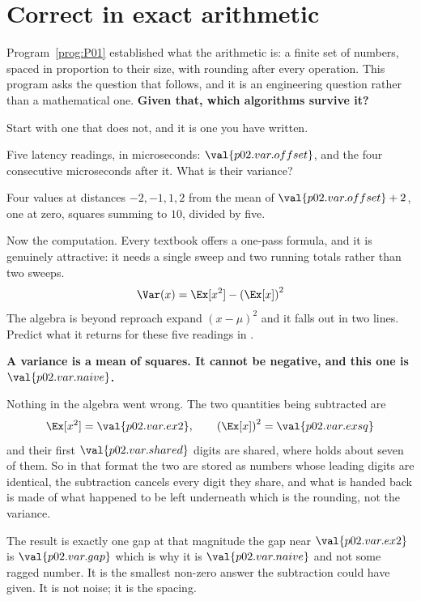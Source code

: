 \section{Correct in exact arithmetic}
\label{sec:P02-correct}

\begin{fr}
Program~\ref{prog:P01} established what the arithmetic is: a finite set of
numbers, spaced in proportion to their size, with rounding after every
operation. This program asks the question that follows, and it is an
engineering question rather than a mathematical one. \textbf{Given that, which
algorithms survive it?}

Start with one that does not, and it is one you have written.

Five latency readings, in microseconds: $\val{p02.var.offset}$, and the four
consecutive microseconds after it. What is their variance?
\nextframe
\end{fr}

\begin{fr}
Four values at distances $-2, -1, 1, 2$ from the mean of
$\val{p02.var.offset} + 2$, one at zero, squares summing to $10$, divided by
five.

Now the computation. Every textbook offers a one-pass formula, and it is
genuinely attractive: it needs a single sweep and two running totals rather
than two sweeps.
\[ \Var(x) = \Ex[x^{2}] - \left(\Ex[x]\right)^{2} \]
The algebra is beyond reproach \dash{} expand $(x - \mu)^2$ and it falls out in
two lines. Predict what it returns for these five readings in .
\nextframe
\end{fr}

\begin{fr}

\begin{trapbox}
\textbf{A variance is a mean of squares. It cannot be negative, and this one
is $\val{p02.var.naive}$.}

Nothing in the algebra went wrong. The two quantities being subtracted are
\[ \Ex[x^{2}] = \val{p02.var.ex2}, \qquad
   \left(\Ex[x]\right)^{2} = \val{p02.var.exsq} \]
and their first $\val{p02.var.shared}$ digits are shared, where
 holds about seven of them. So in that format the two are stored as
numbers whose leading digits are identical, the subtraction cancels every
digit they share, and what is handed back is made of what happened to be left
underneath \dash{} which is the rounding, not the variance.

The result is exactly one gap at that magnitude \dash{} the 
gap near $\val{p02.var.ex2}$ is $\val{p02.var.gap}$ \dash{} which is why it is
$\val{p02.var.naive}$ and not some ragged number. It is the smallest non-zero
answer the subtraction could have given. It is not noise; it is the spacing.
\end{trapbox}
\end{fr}

